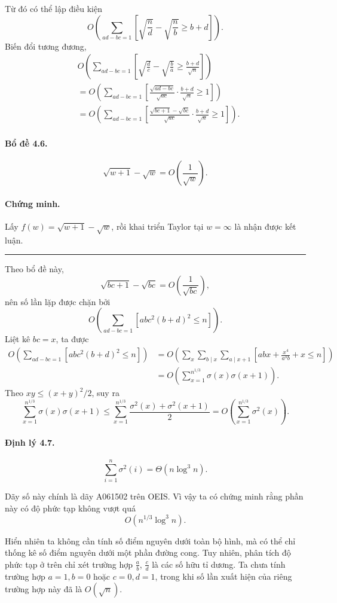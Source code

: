 \documentclass[11pt]{article}
\newcommand{\qedmark}{\hfill\rule{0.7ex}{0.7ex}}
\begin{document}
Từ đó có thể lập điều kiện
\[
O\left(\sum_{ad-bc=1}
\left[\sqrt{\frac nd}-\sqrt{\frac nb}\ge b+d\right]\right).
\]
Biến đổi tương đương,
\[
\begin{aligned}
&O\left(\sum_{ad-bc=1}
\left[\sqrt{\frac dc}-\sqrt{\frac ba}\ge\frac{b+d}{\sqrt n}\right]\right)\\
&=O\left(\sum_{ad-bc=1}
\left[\frac{\sqrt{ad-bc}}{\sqrt{ac}}\cdot\frac{b+d}{\sqrt n}\ge 1\right]\right)\\
&=O\left(\sum_{ad-bc=1}
\left[\frac{\sqrt{bc+1}-\sqrt{bc}}{\sqrt{ac}}\cdot
\frac{b+d}{\sqrt n}\ge 1\right]\right).
\end{aligned}
\]

\paragraph{Bổ đề 4.6.}
\[
  \sqrt{w+1}-\sqrt w=O\left(\frac1{\sqrt w}\right).
\]

\paragraph{Chứng minh.}
Lấy \(f(w)=\sqrt{w+1}-\sqrt w\), rồi khai triển Taylor tại \(w=\infty\) là
nhận được kết luận. \qedmark

Theo bổ đề này,
\[
  \sqrt{bc+1}-\sqrt{bc}=O\left(\frac1{\sqrt{bc}}\right),
\]
nên số lần lặp được chặn bởi
\[
  O\left(\sum_{ad-bc=1}[ab c^2(b+d)^2\le n]\right).
\]
Liệt kê \(bc=x\), ta được
\[
\begin{aligned}
O\left(\sum_{ad-bc=1}[ab c^2(b+d)^2\le n]\right)
&=O\left(\sum_x\sum_{b\mid x}\sum_{a\mid x+1}
\left[abx+\frac{x^4}{a^3b}+x\le n\right]\right)\\
&=O\left(\sum_{x=1}^{n^{1/3}}\sigma(x)\sigma(x+1)\right).
\end{aligned}
\]
Theo \(xy\le (x+y)^2/2\), suy ra
\[
  \sum_{x=1}^{n^{1/3}}\sigma(x)\sigma(x+1)
  \le
  \sum_{x=1}^{n^{1/3}}\frac{\sigma^2(x)+\sigma^2(x+1)}2
  =O\left(\sum_{x=1}^{n^{1/3}}\sigma^2(x)\right).
\]

\paragraph{Định lý 4.7.}
\[
  \sum_{i=1}^{n}\sigma^2(i)=\Theta(n\log^3 n).
\]

Dãy số này chính là dãy A061502 trên OEIS. Vì vậy ta có chứng minh rằng phần
này có độ phức tạp không vượt quá
\[
  O(n^{1/3}\log^3 n).
\]

Hiển nhiên ta không cần tính số điểm nguyên dưới toàn bộ hình, mà có thể chỉ
thống kê số điểm nguyên dưới một phần đường cong. Tuy nhiên, phân tích độ phức
tạp ở trên chỉ xét trường hợp \(\frac{a}{b}\), \(\frac{c}{d}\) là các số hữu
tỉ dương. Ta chưa tính trường hợp \(a=1,b=0\) hoặc \(c=0,d=1\), trong khi số
lần xuất hiện của riêng trường hợp này đã là \(O(\sqrt n)\).
\end{document}

